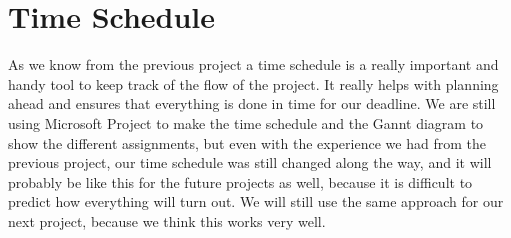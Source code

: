 \section{Time Schedule}
As we know from the previous project a time schedule is a really important and handy tool to keep track of the flow of the project. It really helps with planning ahead and ensures that everything is done in time for our deadline. We are still using Microsoft Project to make the time schedule and the Gannt diagram to show the different assignments, but even with the experience we had from the previous project, our time schedule was still changed along the way, and it will probably be like this for the future projects as well, because it is difficult to predict how everything will turn out.
We will still use the same approach for our next project, because we think this works very well.